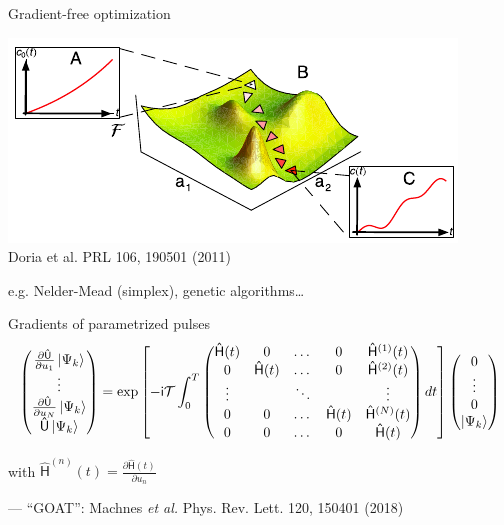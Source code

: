 \documentclass[compress, aspectratio=169]{beamer}
\newcommand{\Op}[1]{\ensuremath{\mathsf{\hat{#1}}}}
\newcommand{\ii}{\mathsf{i}}
\newcommand{\TimeOrder}{\mathcal{T}}
\begin{document}
\begin{frame}{Gradient-free optimization}
  \begin{center}
  \includegraphics{images/nelder_mead}\\
      {\footnotesize\vspace{-2mm}\hspace{-15mm} Doria et al. PRL 106, 190501 (2011)}
  \end{center}
  \vspace{12pt}
  e.g. Nelder-Mead (simplex), genetic algorithms\dots
\end{frame}

\begin{frame}{Gradients of parametrized pulses}
    \begin{equation*}%
      \begin{pmatrix}
        \frac{\partial \Op{U}}{\partial u_1} \ket{\Psi_k} \\
          \vdots\\
          \frac{\partial \Op{U}}{\partial u_N} \ket{\Psi_k} \\
          \Op{U} \ket{\Psi_k}
        \end{pmatrix}
      = \exp \left[-\ii \TimeOrder \int_0^T \begin{pmatrix}
        \Op{H}(t) & 0 & \dots & 0 &\Op{H}^{(1)}(t) \\
        0 & \Op{H}(t) & \dots & 0 & \Op{H}^{(2)}(t) \\
        \vdots & & \ddots & & \vdots \\
        0 & 0 & \dots & \Op{H}(t) & \Op{H}^{(N)}(t) \\
        0 & 0 & \dots & 0 & \Op{H}(t)
      \end{pmatrix} dt\right]
      \begin{pmatrix} 0 \\ \vdots \\ 0 \\ \ket{\Psi_k} \end{pmatrix}
    \end{equation*}
    \par
    \vspace{5mm}
    \hspace{1cm}
    with $\Op{H}^{(n)}(t) = \frac{\partial \Op{H}(t)}{\partial u_n}$
    \par
    \vspace{5mm}
    {\footnotesize
      \hfill --- ``GOAT'': Machnes \textit{et al.}  Phys. Rev. Lett. 120, 150401 (2018)
    }

\end{frame}
\end{document}
